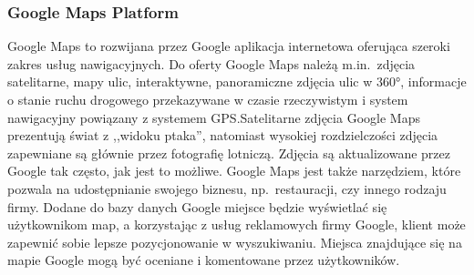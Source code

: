         \subsubsection{Google Maps Platform}
        Google Maps to rozwijana przez Google aplikacja internetowa oferująca szeroki zakres usług nawigacyjnych. Do oferty Google Maps należą m.in.\ zdjęcia satelitarne, mapy ulic, interaktywne,
        panoramiczne zdjęcia ulic w 360°, informacje o stanie ruchu drogowego przekazywane w czasie rzeczywistym i system nawigacyjny powiązany z systemem GPS.\@ Satelitarne zdjęcia Google Maps
        prezentują świat z ,,widoku ptaka'', natomiast wysokiej rozdzielczości zdjęcia zapewniane są głównie przez fotografię lotniczą. Zdjęcia są aktualizowane przez Google tak często, jak jest to możliwe.
        Google Maps jest także narzędziem, które pozwala na udostępnianie swojego biznesu, np.\ restauracji, czy innego rodzaju firmy. Dodane do bazy danych Google miejsce będzie
        wyświetlać się użytkownikom map, a korzystając z usług reklamowych firmy Google, klient może zapewnić sobie lepsze pozycjonowanie w wyszukiwaniu. Miejsca znajdujące się na mapie Google
        mogą być oceniane i komentowane przez użytkowników. 

